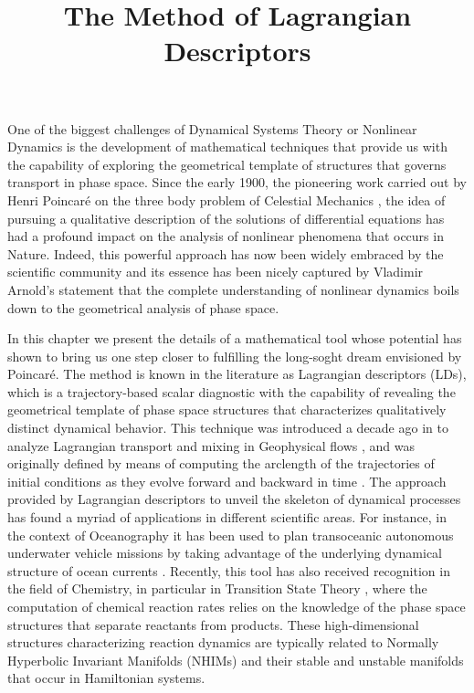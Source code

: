 \documentclass[9pt]{article}
\begin{document}

	
\title{The Method of Lagrangian Descriptors}

\date{}
	
	
\maketitle

One of the biggest challenges of Dynamical Systems Theory or Nonlinear Dynamics is the development of mathematical techniques that provide us with the capability of exploring the geometrical template of structures that governs transport in phase space. Since the early 1900, the pioneering work carried out by Henri Poincar\'e on the three body problem of Celestial Mechanics \cite{hp1890}, the idea of pursuing a qualitative description of the solutions of differential equations has had a profound impact on the analysis of nonlinear phenomena that occurs in Nature. Indeed, this powerful approach has now been widely embraced by the scientific community and its essence has been nicely captured by Vladimir Arnold's statement that the complete understanding of nonlinear dynamics boils down to the geometrical analysis of phase space. 

In this chapter we present the details of a mathematical tool whose potential has shown to bring us one step closer to fulfilling the long-soght dream envisioned by Poincar\'e. The method is known in the literature as Lagrangian descriptors (LDs), which is a trajectory-based scalar diagnostic with the capability of revealing the geometrical template of phase space structures that characterizes qualitatively distinct dynamical behavior. This technique was introduced a decade ago in \cite{madrid2009} to analyze Lagrangian transport and mixing in Geophysical flows \cite{mendoza2010}, and was originally defined by means of computing the arclength of the trajectories of initial conditions as they evolve forward and backward in time \cite{mancho2013lagrangian}. The approach provided by Lagrangian descriptors to unveil the skeleton of dynamical processes has found a myriad of applications in different scientific areas. For instance, in the context of Oceanography it has been used to plan transoceanic autonomous underwater vehicle missions by taking advantage of the underlying dynamical structure of ocean currents \cite{ramos2018}. Recently, this tool has also received recognition in the field of Chemistry, in particular in Transition State Theory \cite{craven2015lagrangian,craven2016deconstructing,craven2017lagrangian}, where the computation of chemical reaction rates relies on the knowledge of the phase space structures that separate reactants from products. These high-dimensional structures characterizing reaction dynamics are typically related to Normally Hyperbolic Invariant Manifolds (NHIMs) and their stable and unstable manifolds that occur in Hamiltonian systems.
\end{document}
